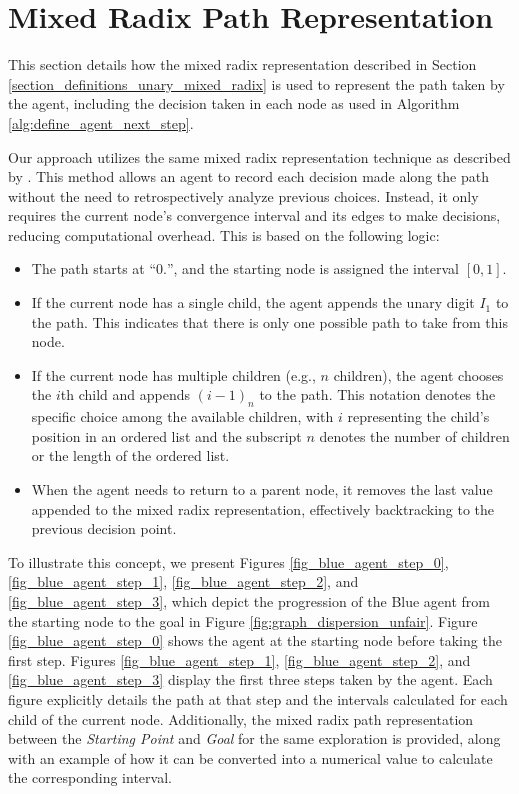\section{Mixed Radix Path Representation}
\label{section_method_mixed_radix}

This section details how the mixed radix representation described in Section \ref{section_definitions_unary_mixed_radix}
is used to represent the path taken by the agent, including the decision taken in each node as used in Algorithm \ref{alg:define_agent_next_step}.

Our approach utilizes the same mixed radix representation technique as described by .
This method allows an agent to record each decision made along the path without the need to retrospectively analyze previous choices.
Instead, it only requires the current node's convergence interval and its edges to make decisions, reducing computational overhead. This is based on the following logic:

\begin{itemize}
    \item The path starts at ``$0.$'', and the starting node is assigned the interval $[0,1]$.
    \item If the current node has a single child, the agent appends the unary digit $I_1$ to the path. This indicates that there is only one possible path to take from this node.
    \item If the current node has multiple children (e.g., $n$ children), the agent chooses the $i$th child and appends $(i-1)_n$ to the path. This notation denotes the specific choice among the available children, with $i$ representing the child's position in an ordered list and the subscript $n$ denotes the number of children or the length of the ordered list.
    \item When the agent needs to return to a parent node, it removes the last value appended to the mixed radix representation, effectively backtracking to the previous decision point.
\end{itemize}


To illustrate this concept, we present Figures \ref{fig_blue_agent_step_0}, \ref{fig_blue_agent_step_1}, \ref{fig_blue_agent_step_2}, and \ref{fig_blue_agent_step_3}, which depict the progression of the Blue agent from the starting node to the goal in Figure \ref{fig:graph_dispersion_unfair}. Figure \ref{fig_blue_agent_step_0} shows the agent at the starting node before taking the first step. Figures \ref{fig_blue_agent_step_1}, \ref{fig_blue_agent_step_2}, and \ref{fig_blue_agent_step_3} display the first three steps taken by the agent. Each figure explicitly details the path at that step and the intervals calculated for each child of the current node. Additionally, the mixed radix path representation between the \textit{Starting Point} and \textit{Goal} for the same exploration is provided, along with an example of how it can be converted into a numerical value to calculate the corresponding interval.

